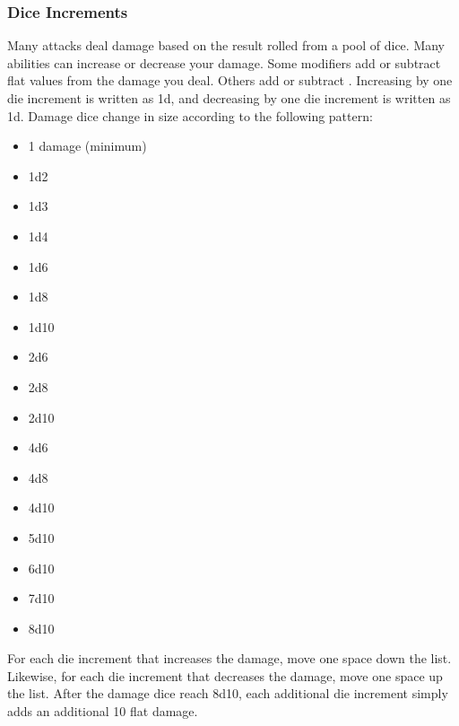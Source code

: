         \subsubsection{Dice Increments}\label{Dice Increments}
            Many attacks deal damage based on the result rolled from a pool of dice.
            Many abilities can increase or decrease your damage.
            Some modifiers add or subtract flat values from the damage you deal.
            Others add or subtract .
            Increasing by one die increment is written as \plus1d, and decreasing by one die increment is written as \minus1d.
            Damage dice change in size according to the following pattern:
            \begin{itemize}
                \item 1 damage (minimum)
                \item 1d2
                \item 1d3
                \item 1d4
                \item 1d6
                \item 1d8
                \item 1d10
                \item 2d6
                \item 2d8
                \item 2d10
                \item 4d6
                \item 4d8
                \item 4d10
                \item 5d10
                \item 6d10
                \item 7d10
                \item 8d10
            \end{itemize}

            For each die increment that increases the damage, move one space down the list.
            Likewise, for each die increment that decreases the damage, move one space up the list.
            After the damage dice reach 8d10, each additional die increment simply adds an additional 10 flat damage.

